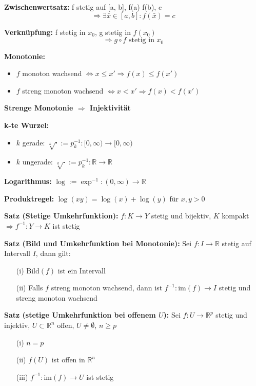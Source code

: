 \begin{itemize}
\textbf{Zwischenwertsatz:}  
f stetig auf [a, b],\; f(a) \leq f(b),\; c \in [f(a), f(b)]  
\[
\Rightarrow \exists \bar{x} \in [a, b]: f(\bar{x}) = c
\]

\textbf{Verknüpfung:}  
f stetig in \( x_0 \),\; g stetig in \( f(x_0) \)  
\[
\Rightarrow g \circ f \text{ stetig in } x_0
\]

\textbf{Monotonie:}
\begin{itemize}
  \item \(f\) monoton wachsend \(\Leftrightarrow x \le x' \Rightarrow f(x) \le f(x')\)
  \item \(f\) streng monoton wachsend \(\Leftrightarrow x < x' \Rightarrow f(x) < f(x')\)
\end{itemize}

\textbf{Strenge Monotonie $\Rightarrow$ Injektivität}

\textbf{k-te Wurzel:}
\begin{itemize}
  \item \(k\) gerade: \(\sqrt[k]{\cdot} := p_k^{-1}: [0, \infty) \to [0, \infty)\)
  \item \(k\) ungerade: \(\sqrt[k]{\cdot} := p_k^{-1}: \mathbb{R} \to \mathbb{R}\)
\end{itemize}

\textbf{Logarithmus:}  
\(\log := \exp^{-1} : (0,\infty) \to \mathbb{R}\)

\textbf{Produktregel:}  
\(\log(xy) = \log(x) + \log(y)\) für \(x, y > 0\)

\textbf{Satz (Stetige Umkehrfunktion):}  
\(f: K \to Y\) stetig und bijektiv,\; \(K\) kompakt  
\(\Rightarrow f^{-1}: Y \to K\) ist stetig

\textbf{Satz (Bild und Umkehrfunktion bei Monotonie):}  
Sei \(f: I \to \mathbb{R}\) stetig auf Intervall \(I\), dann gilt:
\begin{itemize}
  \item[(i)] \(\text{Bild}(f)\) ist ein Intervall
  \item[(ii)] Falls \(f\) streng monoton wachsend, dann ist \(f^{-1}: \text{im}(f) \to I\) stetig und streng monoton wachsend
\end{itemize}

\textbf{Satz (stetige Umkehrfunktion bei offenem \(U\)):}  
Sei \(f: U \to \mathbb{R}^p\) stetig und injektiv, \(U \subset \mathbb{R}^n\) offen, \(U \ne \emptyset\), \(n \ge p\)

\begin{itemize}
  \item[(i)] \(n = p\)
  \item[(ii)] \(f(U)\) ist offen in \(\mathbb{R}^n\)
  \item[(iii)] \(f^{-1}: \text{im}(f) \to U\) ist stetig
\end{itemize}



\end{itemize}
